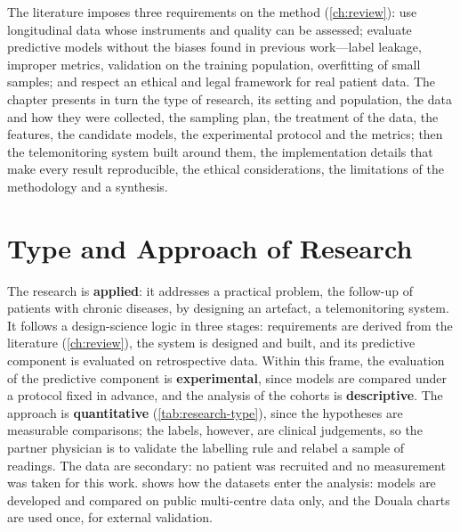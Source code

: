 \documentclass[11pt,a4paper,oneside]{report}
\begin{document}
The literature imposes three requirements on the method (\cref{ch:review}): use longitudinal data whose instruments and quality can be assessed; evaluate predictive models without the biases found in previous work---label leakage, improper metrics, validation on the training population, overfitting of small samples; and respect an ethical and legal framework for real patient data. The chapter presents in turn the type of research, its setting and population, the data and how they were collected, the sampling plan, the treatment of the data, the features, the candidate models, the experimental protocol and the metrics; then the telemonitoring system built around them, the implementation details that make every result reproducible, the ethical considerations, the limitations of the methodology and a synthesis.

\section{Type and Approach of Research}\label{sec:research-type}\label{sec:analysis}

The research is \textbf{applied}: it addresses a practical problem, the follow-up of patients with chronic diseases, by designing an artefact, a telemonitoring system. It follows a design-science logic in three stages: requirements are derived from the literature (\cref{ch:review}), the system is designed and built, and its predictive component is evaluated on retrospective data. Within this frame, the evaluation of the predictive component is \textbf{experimental}, since models are compared under a protocol fixed in advance, and the analysis of the cohorts is \textbf{descriptive}. The approach is \textbf{quantitative} (\cref{tab:research-type}), since the hypotheses are measurable comparisons; the labels, however, are clinical judgements, so the partner physician is to validate the labelling rule and relabel a sample of readings. The data are secondary: no patient was recruited and no measurement was taken for this work.  shows how the datasets enter the analysis: models are developed and compared on public multi-centre data only, and the Douala charts are used once, for external validation.
\end{document}
